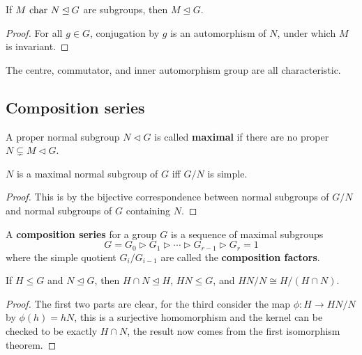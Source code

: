 \documentclass{article}
\begin{document}
\begin{proposition}
    If $M\text{ char } N \unlhd G$ are subgroups, then $M\unlhd G$.
    \begin{proof}
        For all $g\in G$, conjugation by $g$ is an automorphism of $N$, under which $M$ is invariant.
    \end{proof}
\end{proposition}

The centre, commutator, and inner automorphism group are all characteristic.

\subsection{Composition series}

\begin{definition}
    A proper normal subgroup $N\lhd G$ is called \textbf{maximal} if there are no proper $N\subsetneq M\lhd G$.
\end{definition}

\begin{lemma}
    $N$ is a maximal normal subgroup of $G$ iff $G/N$ is simple.\begin{proof}
        This is by the bijective correspondence between normal subgroups of $G/N$ and normal subgroups of $G$ containing $N$.
    \end{proof}
\end{lemma}

\begin{definition}
    A \textbf{composition series} for a group $G$ is a sequence of maximal subgroups \[
    G = G_0 \rhd  G_1 \rhd \cdots \rhd G_{r-1} \rhd G_r = 1
    \] where the simple quotient $G_i/G_{i-1}$ are called the \textbf{composition factors}.
\end{definition}

\begin{proposition}
    If $H\leq G$ and $N\unlhd G$, then $H\cap N \unlhd H$, $HN\leq G$, and $HN/N\cong H/(H\cap N)$.
    \begin{proof}
        The first two parts are clear, for the third consider the map $\phi:H\rightarrow HN/N$ by $\phi(h) = hN$, this is a surjective homomorphism and the kernel can be checked to be exactly $H\cap N$, the result now comes from the first isomorphism theorem.
    \end{proof}
\end{proposition}
\end{document}
